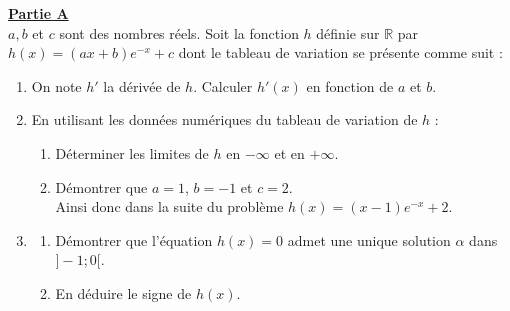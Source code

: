 \documentclass[12pt,a4paper]{article}
\begin{document}
\noindent \underline{\textbf{Partie A}} \\
$a, b$ et $c$ sont des nombres réels. Soit la fonction $h$ définie sur $\mathbb{R}$ par $h(x) = (ax + b)e^{-x} + c$ dont le tableau de variation se présente comme suit :
\begin{center}
\end{center}

\begin{enumerate}
    \item On note $h'$ la dérivée de $h$. Calculer $h'(x)$ en fonction de $a$ et $b$.
    \item En utilisant les données numériques du tableau de variation de $h$ :
    \begin{enumerate}
        \item Déterminer les limites de $h$ en $-\infty$ et en $+\infty$.
        \item Démontrer que $a = 1$, $b = -1$ et $c = 2$. \\
        Ainsi donc dans la suite du problème $h(x) = (x - 1)e^{-x} + 2$.
    \end{enumerate}
    \item \begin{enumerate}
        \item Démontrer que l'équation $h(x) = 0$ admet une unique solution $\alpha$ dans $]-1; 0[$.
        \item En déduire le signe de $h(x)$.
    \end{enumerate}
\end{enumerate}

\vspace{0.5cm}
\end{document}
